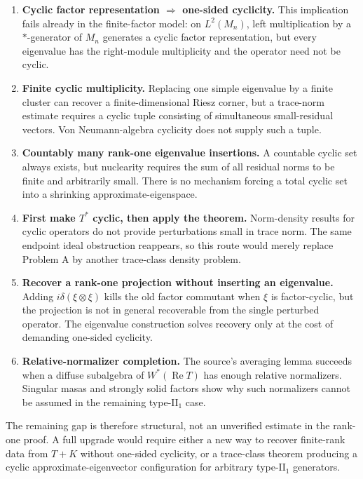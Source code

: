 \documentclass[11pt]{article}
\begin{document}
\begin{enumerate}
\item \textbf{Cyclic factor representation $\Rightarrow$ one-sided cyclicity.}
This implication fails already in the finite-factor model: on $L^2(M_n)$, left multiplication by a $*$-generator of $M_n$ generates a cyclic factor representation, but every eigenvalue has the right-module multiplicity and the operator need not be cyclic.

\item \textbf{Finite cyclic multiplicity.}
Replacing one simple eigenvalue by a finite cluster can recover a finite-dimensional Riesz corner, but a trace-norm estimate requires a cyclic tuple consisting of simultaneous small-residual vectors.  Von Neumann-algebra cyclicity does not supply such a tuple.

\item \textbf{Countably many rank-one eigenvalue insertions.}
A countable cyclic set always exists, but nuclearity requires the sum of all residual norms to be finite and arbitrarily small.  There is no mechanism forcing a total cyclic set into a shrinking approximate-eigenspace.

\item \textbf{First make $T^*$ cyclic, then apply the theorem.}
Norm-density results for cyclic operators do not provide perturbations small in trace norm.  The same endpoint ideal obstruction reappears, so this route would merely replace Problem A by another trace-class density problem.

\item \textbf{Recover a rank-one projection without inserting an eigenvalue.}
Adding $i\delta(\xi\otimes\xi)$ kills the old factor commutant when $\xi$ is factor-cyclic, but the projection is not in general recoverable from the single perturbed operator.  The eigenvalue construction solves recovery only at the cost of demanding one-sided cyclicity.

\item \textbf{Relative-normalizer completion.}
The source's averaging lemma succeeds when a diffuse subalgebra of $W^*(\operatorname{Re}T)$ has enough relative normalizers.  Singular masas and strongly solid factors show why such normalizers cannot be assumed in the remaining type-$\mathrm{II}_1$ case.
\end{enumerate}

The remaining gap is therefore structural, not an unverified estimate in the rank-one proof.  A full upgrade would require either a new way to recover finite-rank data from $T+K$ without one-sided cyclicity, or a trace-class theorem producing a cyclic approximate-eigenvector configuration for arbitrary type-$\mathrm{II}_1$ generators.
\end{document}
